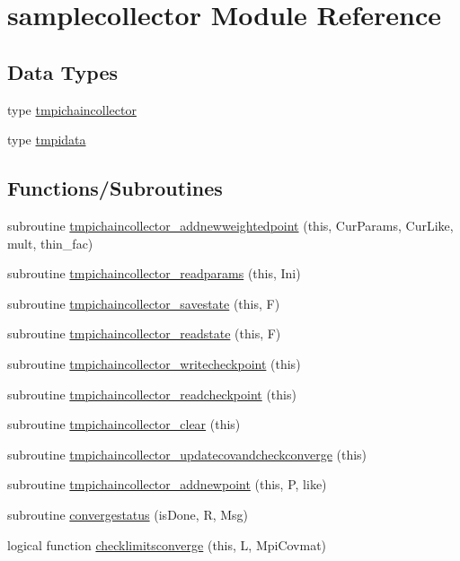 \hypertarget{namespacesamplecollector}{}\section{samplecollector Module Reference}
\label{namespacesamplecollector}
\subsection*{Data Types}
\begin{DoxyCompactItemize}
\item 
type \mbox{\hyperlink{structsamplecollector_1_1tmpichaincollector}{tmpichaincollector}}
\item 
type \mbox{\hyperlink{structsamplecollector_1_1tmpidata}{tmpidata}}
\end{DoxyCompactItemize}
\subsection*{Functions/\+Subroutines}
\begin{DoxyCompactItemize}
\item 
subroutine \mbox{\hyperlink{namespacesamplecollector_ac96bef33ce0ce505eee01406eafe5149}{tmpichaincollector\+\_\+addnewweightedpoint}} (this, Cur\+Params, Cur\+Like, mult, thin\+\_\+fac)
\item 
subroutine \mbox{\hyperlink{namespacesamplecollector_ac3a30bf96000547a9f7264b18de0c72a}{tmpichaincollector\+\_\+readparams}} (this, Ini)
\item 
subroutine \mbox{\hyperlink{namespacesamplecollector_ab16744dcc4f11cae903c0fdb4daee0fb}{tmpichaincollector\+\_\+savestate}} (this, F)
\item 
subroutine \mbox{\hyperlink{namespacesamplecollector_a7c25b3057e5a67cd55bfe6b4edecc647}{tmpichaincollector\+\_\+readstate}} (this, F)
\item 
subroutine \mbox{\hyperlink{namespacesamplecollector_af8bf18826b2f8249278410b12ee73c22}{tmpichaincollector\+\_\+writecheckpoint}} (this)
\item 
subroutine \mbox{\hyperlink{namespacesamplecollector_a728766fe371777731c80f0e82ccba130}{tmpichaincollector\+\_\+readcheckpoint}} (this)
\item 
subroutine \mbox{\hyperlink{namespacesamplecollector_ad209f28cb743e15c21d107934917f478}{tmpichaincollector\+\_\+clear}} (this)
\item 
subroutine \mbox{\hyperlink{namespacesamplecollector_a92e783bc78c7af280b704150840b84cb}{tmpichaincollector\+\_\+updatecovandcheckconverge}} (this)
\item 
subroutine \mbox{\hyperlink{namespacesamplecollector_a30e39ef70fabba57b75d0ddea5f75e84}{tmpichaincollector\+\_\+addnewpoint}} (this, P, like)
\item 
subroutine \mbox{\hyperlink{namespacesamplecollector_aedac586422a605cbd11d9c0892242684}{convergestatus}} (is\+Done, R, Msg)
\item 
logical function \mbox{\hyperlink{namespacesamplecollector_aa4decfd3d422ec7bc2ca897a53e155c1}{checklimitsconverge}} (this, L, Mpi\+Covmat)
\end{DoxyCompactItemize}

